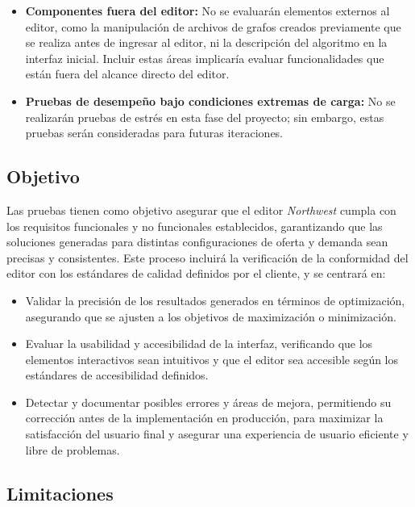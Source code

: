 \documentclass[stu, 12pt, letterpaper, donotrepeattitle, floatsintext, natbib]{apa7}
\begin{document}
\begin{itemize}
    \item \textbf{Componentes fuera del editor:} No se evaluarán elementos externos al editor, como la manipulación de archivos de grafos creados previamente que se realiza antes de ingresar al editor, ni la descripción del algoritmo en la interfaz inicial. Incluir estas áreas implicaría evaluar funcionalidades que están fuera del alcance directo del editor.
    
    \item \textbf{Pruebas de desempeño bajo condiciones extremas de carga:} No se realizarán pruebas de estrés en esta fase del proyecto; sin embargo, estas pruebas serán consideradas para futuras iteraciones.
    
\end{itemize}

\subsection{Objetivo}

\noindent Las pruebas tienen como objetivo asegurar que el editor \textit{Northwest} cumpla con los requisitos funcionales y no funcionales establecidos, garantizando que las soluciones generadas para distintas configuraciones de oferta y demanda sean precisas y consistentes. Este proceso incluirá la verificación de la conformidad del editor con los estándares de calidad definidos por el cliente, y se centrará en:

\begin{itemize}
    \item Validar la precisión de los resultados generados en términos de optimización, asegurando que se ajusten a los objetivos de maximización o minimización.
    \item Evaluar la usabilidad y accesibilidad de la interfaz, verificando que los elementos interactivos sean intuitivos y que el editor sea accesible según los estándares de accesibilidad definidos.
    \item Detectar y documentar posibles errores y áreas de mejora, permitiendo su corrección antes de la implementación en producción, para maximizar la satisfacción del usuario final y asegurar una experiencia de usuario eficiente y libre de problemas.
\end{itemize}

\subsection{Limitaciones}
\end{document}
